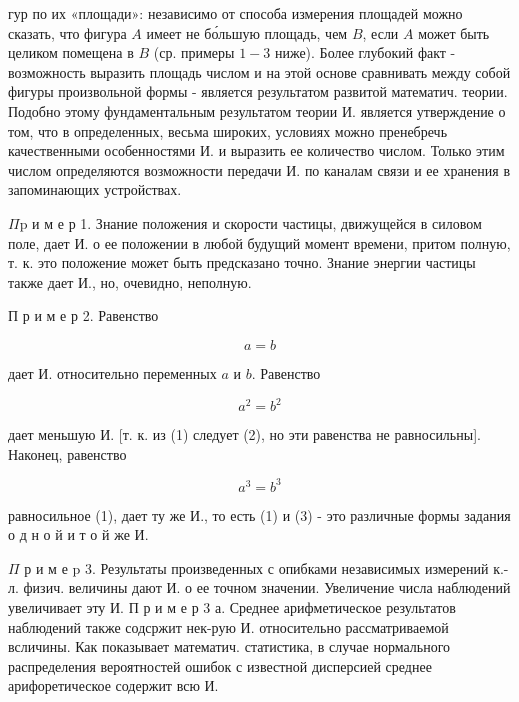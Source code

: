 \documentclass[10pt]{article}
\begin{document}
гур по их «площади»: независимо от способа измерения площадей можно сказать, что фигура $A$ имеет не бо́льшую площадь, чем $B$, если $A$ может быть целиком помещена в $B$ (ср. примеры $1-3$ ниже). Более глубокий факт - возможность выразить площадь числом и на этой основе сравнивать между собой фигуры произвольной формы - является результатом развитой математич. теории. Подобно этому фундаментальным результатом теории И. является утверждение о том, что в определенных, весьма широких, условиях можно пренебречь качественными особенностями И. и выразить ее количество числом. Только этим числом определяются возможности передачи И. по каналам связи и ее хранения в запоминающих устройствах.



$\Pi \mathrm{p}$ и м е р 1. Знание положения и скорости частицы, движущейся в силовом поле, дает И. о ее положении в любой будущий момент времени, притом полную, т. к. это положение может быть предсказано точно. Знание энергии частицы также дает И., но, очевидно, неполную.



П р и м е р 2. Равенство



\[

a=b

\]



дает И. относительно переменных $a$ и $b$. Равенство



\[

a^{2}=b^{2}

\]



дает меньшую И. [т. к. из (1) следует (2), но эти равенства не равносильны]. Наконец, равенство



\[

a^{3}=b^{3}

\]



равносильное (1), дает ту же И., то есть (1) и (3) - это различные формы задания о д н о й и т о й же И.



$\Pi$ р и м е p 3. Результаты произведенных с опибками независимых измерений к.-л. физич. величины дают И. о ее точном значении. Увеличение числа наблюдений увеличивает эту И. П р и м е р 3 а. Среднее арифметическое результатов наблюдений также содсржит нек-рую И. относительно рассматриваемой всличины. Как показывает математич. статистика, в случае нормального распределения вероятностей ошибок с известной дисперсией среднее арифоретическое содержит всю И.
\end{document}
